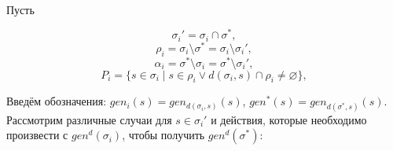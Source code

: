 



\\

Пусть

$$\sigma_i' = \sigma_i \cap \sigma^*,$$
$$\rho_i = \sigma_i \setminus \sigma^* = \sigma_i \setminus \sigma_i',$$
$$\alpha_i = \sigma^* \setminus \sigma_i = \sigma^* \setminus \sigma_i',$$
$$P_i = \{s \in \sigma_i \mid s \in \rho_i \vee d(\sigma_i, s) \cap \rho_i \neq \varnothing \},$$

\begin{comment}
$$A_i = \{s \mid s \in \alpha_i \vee d(\sigma^*, s) \cap \alpha_i \neq \varnothing \} \cup (P_i \setminus \rho_i),$$

	тогда
	$$gen^d(\sigma^*) = \left( \bigcup\limits_{i = 1}^n \left( gen^d(\sigma_i) \setminus \bigcup\limits_{s \in P_i} gen_{d(\sigma_i, s)}(s)\right) \right) \cup \bigcup\limits_{s \in \bigcap\limits_{i = 1}^n A_i} gen_{d(\sigma^*, s)}(s)$$
\end{comment}

\hrulefill

\begin{comment}
	\textbf{Доказательство:}\\

	Пусть некоторый $x \in gen^d(\sigma^*)$. Это означает, что $\exists s_x \in \sigma^*$: $x \in gen_{d(\sigma^*, s_x)} (s_x)$.\\
	Нужно доказать, что $x$ принадлежит правой части, то есть:
	$$
	\left[
	\begin{aligned}
		&\exists a \in \sigma_i \setminus P_i: &x \in gen_{d(\sigma_i, a)} (a)\\
		&\exists b: \forall i \; b \in A_i, &x \in gen_{d(\sigma^*, b)} (b)\\
	\end{aligned}
	\right.
	$$

	Рассмотрим два случая:
	a) $\exists i : s_x \in \sigma_i \setminus P_i, $
\end{comment}

Введём обозначения: $gen_i(s) = gen_{d(\sigma_i, s)}(s)$, $gen^*(s) = gen_{d(\sigma^*, s)}(s)$.\\
Рассмотрим различные случаи для $s \in \sigma_i'$ и действия, которые необходимо произвести с $gen^d(\sigma_i)$, чтобы получить $gen^d(\sigma^*)$: \\

